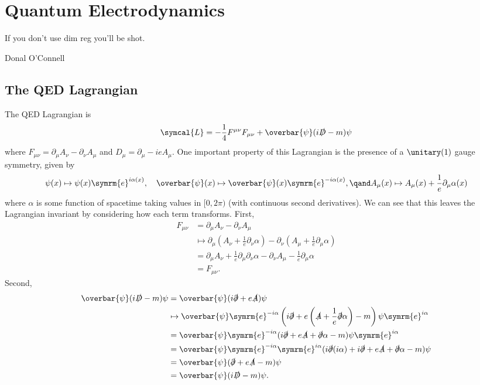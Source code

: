 \documentclass[fleqn]{NotesClass}
\newcommand{\e}{\symrm{e}}
\newcommand{\diracadjoint}[1]{\overbar{#1}}
\newcommand{\covariantDerivative}{D}
\newcommand{\lagrangianDensity}{\symcal{L}}
\begin{document}
    \chapter{Quantum Electrodynamics}
    \epigraph{If you don't use dim reg you'll be shot.}{Donal O'Connell}
    \section{The QED Lagrangian}
    The QED Lagrangian is
    \begin{equation}
        \lagrangianDensity = -\frac{1}{4}F^{\mu\nu}F_{\mu\nu} + \diracadjoint{\psi} (i\slashed{\covariantDerivative} - m)\psi
    \end{equation}
    where \(F_{\mu\nu} = \partial_\mu A_\nu - \partial_\nu A_\mu\) and \(\covariantDerivative_\mu = \partial_\mu - ieA_\mu\).
    One important property of this Lagrangian is the presence of a \(\unitary(1)\) gauge symmetry, given by
    \begin{equation*}
        \psi(x) \mapsto \psi(x)\e^{i\alpha(x)}, \quad \diracadjoint{\psi}(x) \mapsto \diracadjoint{\psi}(x) \e^{-i\alpha(x)}, \qand A_\mu(x) \mapsto A_\mu(x) + \frac{1}{e}\partial_\mu \alpha(x)
    \end{equation*}
    where \(\alpha\) is some function of spacetime taking values in \([0, 2\pi)\) (with continuous second derivatives).
    We can see that this leaves the Lagrangian invariant by considering how each term transforms.
    First,
    \begin{align}
        F_{\mu\nu} &= \partial_\mu A_\nu - \partial_\nu A_\mu\\
        &\mapsto \partial_\mu \left( A_\nu + \frac{1}{e}\partial_\nu \alpha \right) - \partial_\nu \left( A_\mu + \frac{1}{e}\partial_\mu \alpha \right)\\
        &= \partial_\mu A_\nu + \frac{1}{e} \partial_\mu \partial_\nu \alpha - \partial_\nu A_\mu - \frac{1}{e} \partial_\mu \alpha\\
        &= F_{\mu\nu}.
    \end{align}
    Second,
    \begin{align}
        \diracadjoint{\psi}(i\slashed{\covariantDerivative} - m)\psi &= \diracadjoint{\psi}(i\slashed{\partial} + e\slashed{A})\psi\\
        &\mapsto \diracadjoint{\psi}\e^{-i\alpha}\left( i\slashed{\partial} + e\left( \slashed{A} + \frac{1}{e}\slashed{\partial}\alpha \right) - m \right)\psi\e^{i\alpha}\\
        &= \diracadjoint{\psi}\e^{-i\alpha} (i\slashed{\partial} + e\slashed{A} + \slashed{\partial}\alpha - m) \psi\e^{i\alpha}\\
        &= \diracadjoint{\psi}\e^{-i\alpha}\e^{i\alpha}(i\slashed{\partial}(i\alpha) + i\slashed{\partial} + e\slashed{A} + \slashed{\partial}\alpha - m)\psi\\
        &= \diracadjoint{\psi}(\slashed{\partial} + e\slashed{A} - m)\psi\\
        &= \diracadjoint{\psi}(i\slashed{\covariantDerivative} - m)\psi.
    \end{align}
    
\end{document}
